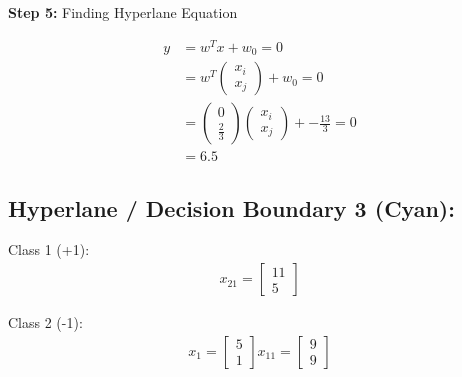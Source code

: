 \documentclass[12pt]{report}
\begin{document}
\vspace{20pt}
\textbf{Step 5:} Finding Hyperlane Equation

\begin{equation}
	\begin{aligned}
		y & = w^Tx + w_{0} = 0                                                                                            \\
		  & = w^T\begin{pmatrix}x_{i} \\x_{j}\end{pmatrix} + w_{0} = 0                                                    \\
		  & = \begin{pmatrix}0        \\ \frac{2}{3}\end{pmatrix}\begin{pmatrix}x_{i}\\x_{j}\end{pmatrix}+-\frac{13}{3}=0 \\
		  & = 6.5
	\end{aligned}
\end{equation}

\pagebreak
\subsection{Hyperlane / Decision Boundary 3 (Cyan):}

Class 1 (+1):
\begin{equation*}
	\begin{aligned}
		x_{21} = \begin{bmatrix}
			         11 \\
			         5
		         \end{bmatrix}
	\end{aligned}
\end{equation*}

Class 2 (-1):
\begin{equation*}
	\begin{aligned}
		x_{1} = \begin{bmatrix}
			        5 \\
			        1
		        \end{bmatrix}
		x_{11} = \begin{bmatrix}
			         9 \\
			         9
		         \end{bmatrix}
	\end{aligned}
\end{equation*}
\end{document}
